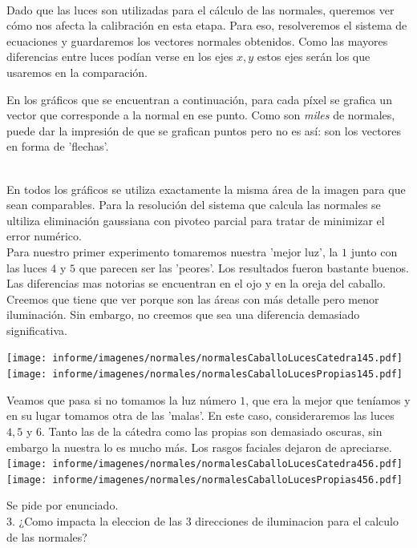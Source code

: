 $ $\newline


Dado que las luces son utilizadas para el cálculo de las normales, queremos ver cómo nos afecta la calibración en esta etapa. Para eso, resolveremos el sistema de ecuaciones y guardaremos los vectores normales obtenidos. Como las mayores diferencias entre luces podían verse en los ejes $x, y$ estos ejes serán los que usaremos en la comparación.

En los gráficos que se encuentran a continuación, para cada píxel se grafica un vector que corresponde a la normal en ese punto. Como son \textit{miles} de normales, puede dar la impresión de que se grafican puntos pero no es así: son los vectores en forma de 'flechas'. \\

$ $\newline

En todos los gráficos se utiliza exactamente la misma área de la imagen para que sean comparables. Para la resolución del sistema que calcula las normales se ultiliza eliminación gaussiana con pivoteo parcial para tratar de minimizar el error numérico. \\

Para nuestro primer experimento tomaremos nuestra 'mejor luz', la $1$ junto con las luces $4$ y $5$ que parecen ser las 'peores'. Los resultados fueron bastante buenos. \\

Las diferencias mas notorias se encuentran en el ojo y en la oreja del caballo. Creemos que tiene que ver porque son las áreas con más detalle pero menor iluminación. Sin embargo, no creemos que sea una diferencia demasiado significativa.

{\centering
    \texttt{[image: informe/imagenes/normales/normalesCaballoLucesCatedra145.pdf]} \\
}
{\centering
    \texttt{[image: informe/imagenes/normales/normalesCaballoLucesPropias145.pdf]} \\
}

\newpage
Veamos que pasa si no tomamos la luz número $1$, que era la mejor que teníamos y en su lugar tomamos otra de las 'malas'. En este caso, consideraremos las luces $4,5$ y $6$. Tanto las de la cátedra como las propias son demasiado oscuras, sin embargo la nuestra lo es mucho más. Los rasgos faciales dejaron de apreciarse. \\

{\centering
    \texttt{[image: informe/imagenes/normales/normalesCaballoLucesCatedra456.pdf]} \\
}
{\centering
    \texttt{[image: informe/imagenes/normales/normalesCaballoLucesPropias456.pdf]} \\
}

\newpage

Se pide por enunciado. \\
3. ¿Como impacta la eleccion de las 3 direcciones de iluminacion para el calculo de las normales? \\
